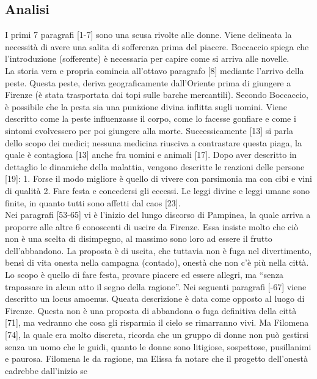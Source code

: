 \documentclass[a4paper]{article}
\newcommand{\quotes}[1]{``#1''}
\begin{document}
\subsection{Analisi}

I primi 7 paragrafi [1-7] sono una scusa rivolte alle donne. Viene delineata la necessità di 
avere una salita di sofferenza prima del piacere.
Boccaccio spiega che l'introduzione (sofferente) è necessaria per capire come si arriva alle novelle. \\
La storia vera e propria comincia all'ottavo paragrafo [8] mediante l'arrivo della peste.
Questa peste, deriva geograficamente dall'Oriente prima di giungere a Firenze
(è stata trasportata dai topi sulle barche mercantili).
Secondo Boccaccio, è possibile che la pesta sia una punizione divina inflitta sugli uomini.
Viene descritto come la peste influenzasse il corpo, come lo facesse gonfiare e come i sintomi evolvessero per poi giungere alla morte.
Successicamente [13] si parla dello scopo dei medici; nessuna medicina riusciva a contrastare questa piaga, la quale è contagiosa [13]
anche fra uomini e animali [17].
Dopo aver descritto in dettaglio le dinamiche della malattia, vengono descritte
le reazioni delle persone [19]: 1. Forse il modo migliore è quello di vivere con parsimonia ma con cibi e vini di qualità
2. Fare festa e concedersi gli eccessi.
Le leggi divine e leggi umane sono finite, in quanto tutti sono affetti dal caos [23].
\\
Nei paragrafi [53-65] vi è l'inizio del lungo discorso di Pampinea, la quale arriva a proporre alle altre 6 conoscenti
di uscire da Firenze. Essa insiste molto che ciò non è una scelta di disimpegno,
al massimo sono loro ad essere il frutto dell'abbandono.
La proposta è di uscita, che tuttavia non è fuga nel divertimento, bensì di vita onesta nella campagna (contado),
onestà che non c'è più nella città. Lo scopo è quello di fare festa, provare piacere ed essere allegri,
ma \quotes{senza trapassare in alcun atto il segno della ragione}.
Nei seguenti paragrafi [-67] viene descritto un locus amoenus.
Queata descrizione è data come opposto al luogo di Firenze.
Questa non è una proposta di abbandona o fuga definitiva della città [71],
ma vedranno che cosa gli risparmia il cielo se rimarranno vivi.
Ma Filomena [74], la quale era molto discreta, ricorda che un gruppo di donne non può gestirsi
senza un uomo che le guidi, quanto le donne sono litigiose, sospettose, pusillanimi e paurosa.
Filomena le da ragione, ma Elissa fa notare che il progetto dell'onestà cadrebbe dall'inizio se
\end{document}
